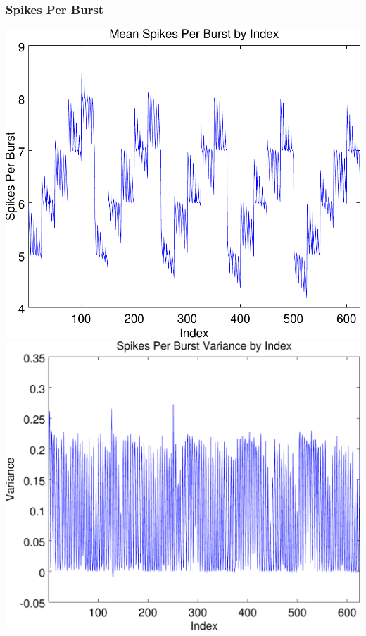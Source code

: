 \documentclass{beamer}
\theoremstyle{plain}
\theoremstyle{definition}
\begin{document}
\begin{frame}\frametitle{Spikes Per Burst}
  \begin{center}
    \includegraphics[scale=.32]{SpikesPerBurst.pdf}%
    \includegraphics[scale=.32]{SpikesPerBurstVariance.pdf}
  \end{center}
\end{frame}
\end{document}
